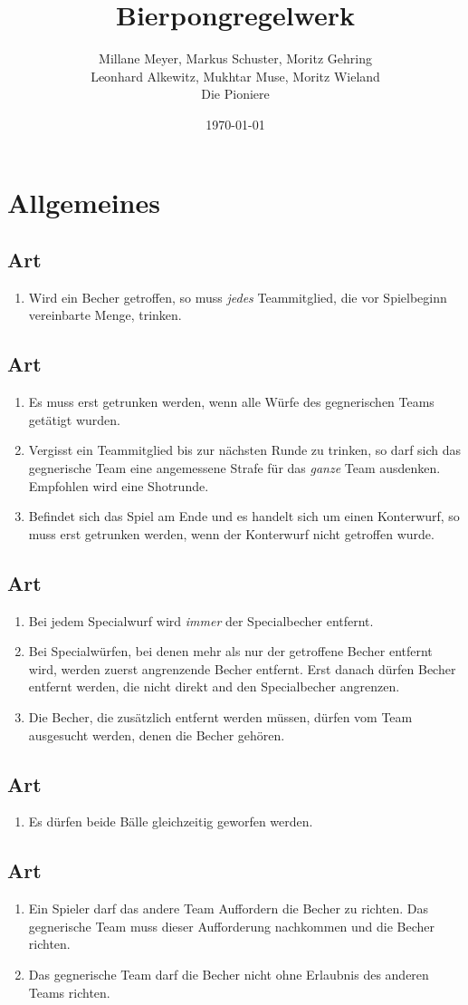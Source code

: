\documentclass[a4paper,11pt]{scrartcl}
\title{\Huge{Bierpongregelwerk}}
\author{Millane Meyer, Markus Schuster, Moritz Gehring \\Leonhard Alkewitz, Mukhtar Muse, Moritz Wieland \\\tiny{Die Pioniere}}
\date{\small{\today}}
\newcommand{\enum}[1]{\begin{enumerate}[label=(\arabic*)]#1\end{enumerate}}
\newcommand{\art}[2]{\subsection*{#1} \enum{#2}}
\newcounter{art}
\begin{document}
\maketitle
\vspace*{-1cm}
\newpage

\section{Allgemeines}
    \art{Art \theart}{
        \item
            Wird ein Becher getroffen, so muss \emph{jedes} Teammitglied, die vor Spielbeginn vereinbarte Menge, trinken.
    }

    \art{Art \theart}{
        \item
            Es muss erst getrunken werden, wenn alle Würfe des gegnerischen Teams getätigt wurden.
        \item
            Vergisst ein Teammitglied bis zur nächsten Runde zu trinken, so darf sich das gegnerische Team eine angemessene Strafe für das \emph{ganze} Team ausdenken. Empfohlen wird eine Shotrunde.
        \item
            Befindet sich das Spiel am Ende und es handelt sich um einen Konterwurf, so muss erst getrunken werden, wenn der Konterwurf nicht getroffen wurde.
    }

    \art{Art \theart}{
        \item
            Bei jedem Specialwurf wird \emph{immer} der Specialbecher entfernt.
        \item
            Bei Specialwürfen, bei denen mehr als nur der getroffene Becher entfernt wird, werden zuerst angrenzende Becher entfernt. Erst danach dürfen Becher entfernt werden, die nicht direkt and den Specialbecher angrenzen.
        \item
            Die Becher, die zusätzlich entfernt werden müssen, dürfen vom Team ausgesucht werden, denen die Becher gehören.
    }

    \art{Art \theart}{
        \item
            Es dürfen beide Bälle gleichzeitig geworfen werden.
    }

    \art{Art \theart}{
        \item
            Ein Spieler darf das andere Team Auffordern die Becher zu richten. Das gegnerische Team muss dieser Aufforderung nachkommen und die Becher richten.
        \item
            Das gegnerische Team darf die Becher nicht ohne Erlaubnis des anderen Teams richten.
    }
\end{document}
